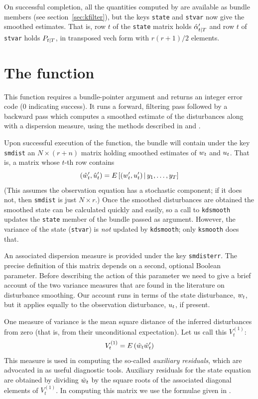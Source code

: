 On successful completion, all the quantities computed by
 are available as bundle members (see
section~\ref{sec:kfilter}), but the keys \texttt{state} and
\texttt{stvar} now give the smoothed estimates.  That is, row $t$ of
the \texttt{state} matrix holds $\hat{\alpha}_{t|T}'$ and row $t$
of \texttt{stvar} holds $P_{t|T}$, in transposed vech form
with $r(r+1)/2$ elements.

\section{The  function}
\label{sec:kdsmooth}

This function requires a bundle-pointer argument and returns an
integer error code (0 indicating success).  It runs a forward,
filtering pass followed by a backward pass which computes a smoothed
estimate of the disturbances along with a dispersion measure, using
the methods described in \cite{koopman93} and \cite{koopman-etal99}.

Upon successful execution of the function, the bundle will contain
under the key \texttt{smdist} an $N \times (r+n)$ matrix holding
smoothed estimates of $w_t$ and $u_t$. That is, a matrix
whose $t$-th row contains
\[
(\hat{w}_t' , \hat{u}_t')
 = E\left[ (w_t' , u_t') \,| \,
   y_1, \ldots, y_T \right]
\]
(This assumes the observation equation has a stochastic component; if
it does not, then \texttt{smdist} is just $N \times r$.) Once the
smoothed disturbances are obtained the smoothed state can be
calculated quickly and easily, so a call to \texttt{kdsmooth} updates
the \texttt{state} member of the bundle passed as argument. However,
the variance of the state (\texttt{stvar}) is \textit{not} updated by
\texttt{kdsmooth}; only \texttt{ksmooth} does that.

An associated dispersion measure is provided under the key
\texttt{smdisterr}. The precise definition of this matrix depends on a
second, optional Boolean parameter. Before describing the action of
this parameter we need to give a brief account of the two variance
measures that are found in the literature on disturbance
smoothing. Our account runs in terms of the state disturbance,
$w_t$, but it applies equally to the observation disturbance,
$u_t$, if present.

One measure of variance is the mean square distance of the inferred
disturbances from zero (that is, from their unconditional
expectation). Let us call this $V^{(1)}_t$:
\[
V^{(1)}_t = E\left(\hat{w}_t\hat{w}_t'\right)
\]
This measure is used in computing the so-called \emph{auxiliary
  residuals}, which are advocated in \cite{durbin-koopman12} as useful
diagnostic tools. Auxiliary residuals for the state equation are
obtained by dividing $\hat{w}_t$ by the square roots of the
associated diagonal elements of $V^{(1)}_t$. In computing this matrix
we use the formulae given in \citet[section 4.4]{koopman-etal99}.

